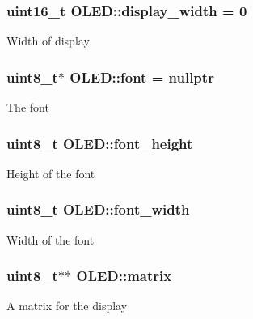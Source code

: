 \subsubsection[{\texorpdfstring{display\+\_\+width}{display_width}}]{\setlength{\rightskip}{0pt plus 5cm}uint16\+\_\+t O\+L\+E\+D\+::display\+\_\+width = 0\hspace{0.3cm}{\ttfamily [private]}}\hypertarget{class_o_l_e_d_ae88ab3d6d63a7ead982a3b7cc673eefe}{}\label{class_o_l_e_d_ae88ab3d6d63a7ead982a3b7cc673eefe}
Width of display 
\subsubsection[{\texorpdfstring{font}{font}}]{\setlength{\rightskip}{0pt plus 5cm}uint8\+\_\+t$\ast$ O\+L\+E\+D\+::font = nullptr\hspace{0.3cm}{\ttfamily [private]}}\hypertarget{class_o_l_e_d_a29ab86a4a73f4d343bf1810927f0911d}{}\label{class_o_l_e_d_a29ab86a4a73f4d343bf1810927f0911d}
The font 
\subsubsection[{\texorpdfstring{font\+\_\+height}{font_height}}]{\setlength{\rightskip}{0pt plus 5cm}uint8\+\_\+t O\+L\+E\+D\+::font\+\_\+height\hspace{0.3cm}{\ttfamily [private]}}\hypertarget{class_o_l_e_d_a85b91421932866dea031921799ba83a3}{}\label{class_o_l_e_d_a85b91421932866dea031921799ba83a3}
Height of the font 
\subsubsection[{\texorpdfstring{font\+\_\+width}{font_width}}]{\setlength{\rightskip}{0pt plus 5cm}uint8\+\_\+t O\+L\+E\+D\+::font\+\_\+width\hspace{0.3cm}{\ttfamily [private]}}\hypertarget{class_o_l_e_d_a3c9ea103adf6c860a2534135e9a25ba8}{}\label{class_o_l_e_d_a3c9ea103adf6c860a2534135e9a25ba8}
Width of the font 
\subsubsection[{\texorpdfstring{matrix}{matrix}}]{\setlength{\rightskip}{0pt plus 5cm}uint8\+\_\+t$\ast$$\ast$ O\+L\+E\+D\+::matrix\hspace{0.3cm}{\ttfamily [private]}}\hypertarget{class_o_l_e_d_a9d32e21189940afba24deab0a2bc0126}{}\label{class_o_l_e_d_a9d32e21189940afba24deab0a2bc0126}
A matrix for the display 
